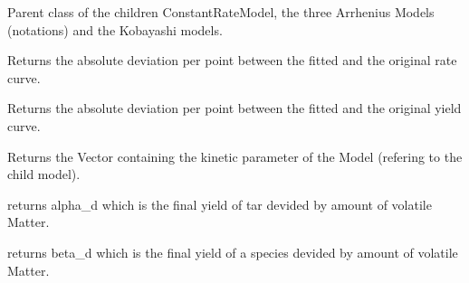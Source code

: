 \documentclass[letterpaper,10pt,english]{sphinxmanual}
\begin{document}
\begin{fulllineitems}
\label{FittingClasses:Fit_one_run.Model}
Parent class of the children ConstantRateModel, the three Arrhenius Models (notations) and the Kobayashi models.

\begin{fulllineitems}
\label{FittingClasses:Fit_one_run.Model.ErrorRate}
Returns the absolute deviation per point between the fitted and the original rate curve.

\end{fulllineitems}


\begin{fulllineitems}
\label{FittingClasses:Fit_one_run.Model.ErrorYield}
Returns the absolute deviation per point between the fitted and the original yield curve.

\end{fulllineitems}


\begin{fulllineitems}
\label{FittingClasses:Fit_one_run.Model.ParamVector}
Returns the Vector containing the kinetic parameter of the Model (refering to the child model).

\end{fulllineitems}


\begin{fulllineitems}
\label{FittingClasses:Fit_one_run.Model.alpha_d}
returns alpha\_d which is the final yield of tar devided by amount of volatile Matter.

\end{fulllineitems}


\begin{fulllineitems}
\label{FittingClasses:Fit_one_run.Model.beta_d}
returns beta\_d which is the final yield of a species devided by amount of volatile Matter.


\end{fulllineitems}
\end{fulllineitems}
\end{document}
